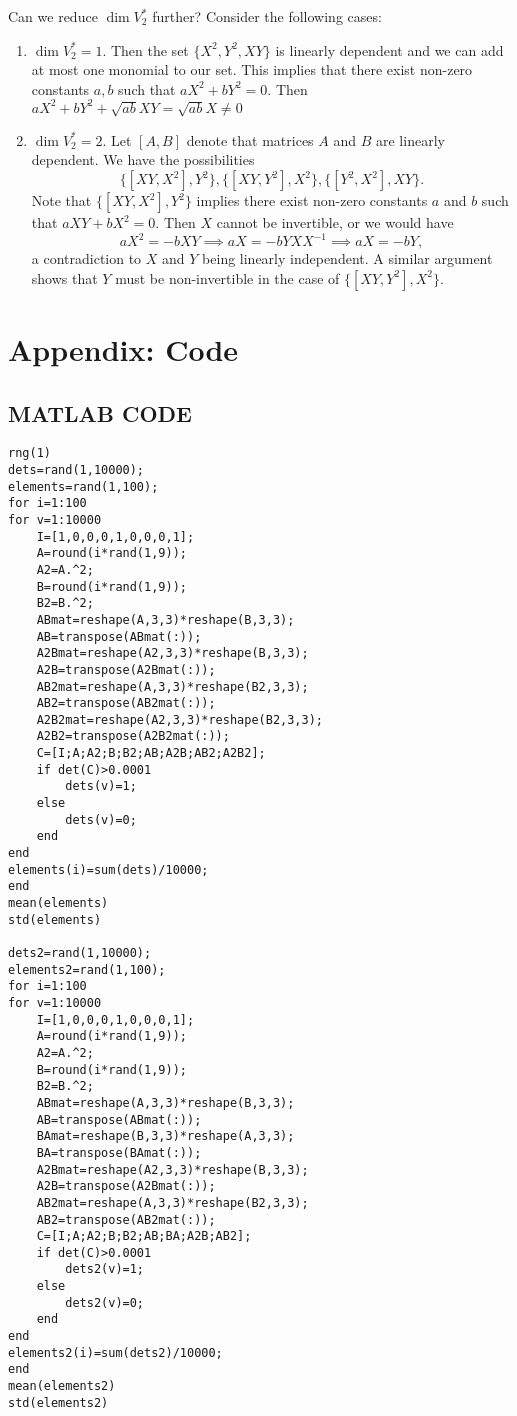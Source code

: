 Can we reduce $\dim V^*_2$ further? Consider the following cases: 
\begin{enumerate}
    \item $\dim V^*_2=1$. Then the set $\{X^2,Y^2,XY\}$ is linearly dependent and we can add at most one monomial to our set. This implies that there exist non-zero constants $a,b$ such that $aX^2+bY^2=0$. Then $aX^2+bY^2+\sqrt{ab}XY=\sqrt{ab}X\neq0$
    \item $\dim V^*_2=2$. Let $[A,B]$ denote that matrices $A$ and $B$ are linearly dependent. We have the possibilities $$\{[XY,X^2],Y^2\},\{[XY,Y^2],X^2\},\{[Y^2,X^2],XY\}.$$ Note that $\{[XY,X^2],Y^2\}$ implies there exist non-zero constants $a$ and $b$ such that $aXY+bX^2=0$. Then $X$ cannot be invertible, or we would have $$aX^2=-bXY\implies aX=-bYXX^{-1}\implies aX=-bY,$$ a contradiction to $X$ and $Y$ being linearly independent. A similar argument shows that $Y$ must be non-invertible in the case of $\{[XY,Y^2],X^2\}$. 
\end{enumerate}
\section*{Appendix: Code}
\subsection*{MATLAB CODE}
\begin{verbatim}
rng(1)
dets=rand(1,10000);
elements=rand(1,100);
for i=1:100
for v=1:10000
    I=[1,0,0,0,1,0,0,0,1];
    A=round(i*rand(1,9));
    A2=A.^2;
    B=round(i*rand(1,9));
    B2=B.^2;
    ABmat=reshape(A,3,3)*reshape(B,3,3); 
    AB=transpose(ABmat(:));
    A2Bmat=reshape(A2,3,3)*reshape(B,3,3); 
    A2B=transpose(A2Bmat(:));
    AB2mat=reshape(A,3,3)*reshape(B2,3,3);
    AB2=transpose(AB2mat(:));
    A2B2mat=reshape(A2,3,3)*reshape(B2,3,3); 
    A2B2=transpose(A2B2mat(:));
    C=[I;A;A2;B;B2;AB;A2B;AB2;A2B2];
    if det(C)>0.0001
        dets(v)=1;
    else 
        dets(v)=0;
    end
end
elements(i)=sum(dets)/10000;
end 
mean(elements)
std(elements) 

dets2=rand(1,10000);
elements2=rand(1,100);
for i=1:100
for v=1:10000
    I=[1,0,0,0,1,0,0,0,1];
    A=round(i*rand(1,9));
    A2=A.^2;
    B=round(i*rand(1,9));
    B2=B.^2;
    ABmat=reshape(A,3,3)*reshape(B,3,3); 
    AB=transpose(ABmat(:));
    BAmat=reshape(B,3,3)*reshape(A,3,3); 
    BA=transpose(BAmat(:));
    A2Bmat=reshape(A2,3,3)*reshape(B,3,3); 
    A2B=transpose(A2Bmat(:));
    AB2mat=reshape(A,3,3)*reshape(B2,3,3);
    AB2=transpose(AB2mat(:));
    C=[I;A;A2;B;B2;AB;BA;A2B;AB2];
    if det(C)>0.0001
        dets2(v)=1;
    else 
        dets2(v)=0;
    end
end
elements2(i)=sum(dets2)/10000;
end 
mean(elements2)
std(elements2) 
\end{verbatim}

